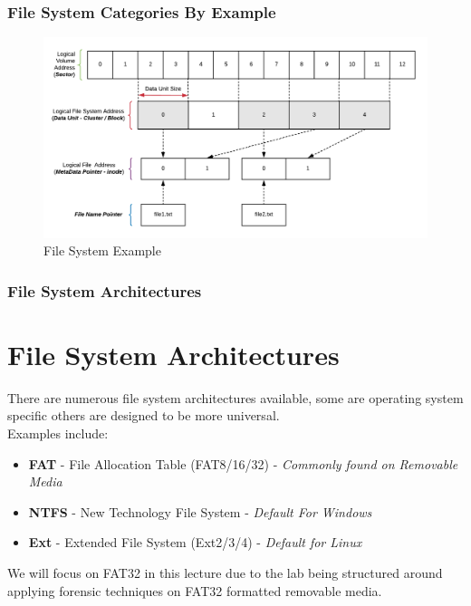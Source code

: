 \documentclass{beamer}
\begin{document}
\begin{frame}
	\frametitle{File System Categories By Example}
	\begin{figure}[h]
		\includegraphics[scale=0.65]{file-system-example}
		\caption{File System Example}
		\label{fig:fs-example}
	\end{figure}
\end{frame}

\begin{frame}
	\frametitle{File System Architectures}
	\section*{File System Architectures}
	There are numerous file system architectures available, some are operating system specific others are designed to be more universal. \\
	\vspace{\baselineskip}
	Examples include:
	\begin{itemize}
		\item \textbf{FAT} - File Allocation Table (FAT8/16/32) - \textit{Commonly found on Removable Media} 
		\item \textbf{NTFS} - New Technology File System - \textit{Default For Windows}
		\item \textbf{Ext} - Extended File System (Ext2/3/4) - \textit{Default for Linux}
	\end{itemize}
		\vspace{\baselineskip}
	We will focus on FAT32 in this lecture due to the lab being structured around applying forensic techniques on FAT32 formatted removable media.
\end{frame}
\end{document}
